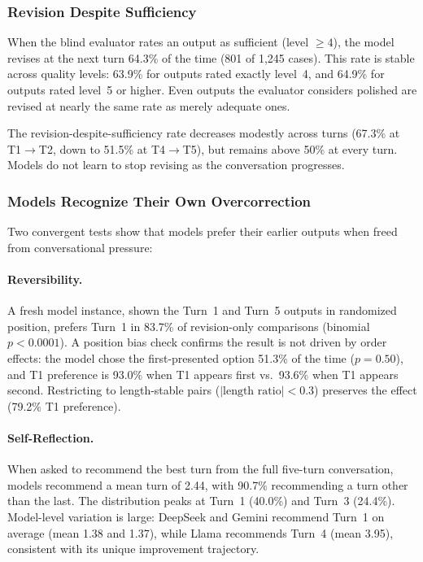 \subsubsection{Revision Despite Sufficiency}

When the blind evaluator rates an output as sufficient (level $\geq 4$), the model revises at the next turn 64.3\% of the time (801 of 1,245 cases). This rate is stable across quality levels: 63.9\% for outputs rated exactly level~4, and 64.9\% for outputs rated level~5 or higher. Even outputs the evaluator considers polished are revised at nearly the same rate as merely adequate ones.

The revision-despite-sufficiency rate decreases modestly across turns (67.3\% at T1$\to$T2, down to 51.5\% at T4$\to$T5), but remains above 50\% at every turn. Models do not learn to stop revising as the conversation progresses.

\subsubsection{Models Recognize Their Own Overcorrection}

Two convergent tests show that models prefer their earlier outputs when freed from conversational pressure:

\paragraph{Reversibility.} A fresh model instance, shown the Turn~1 and Turn~5 outputs in randomized position, prefers Turn~1 in 83.7\% of revision-only comparisons (binomial $p < 0.0001$). A position bias check confirms the result is not driven by order effects: the model chose the first-presented option 51.3\% of the time ($p = 0.50$), and T1 preference is 93.0\% when T1 appears first vs.\ 93.6\% when T1 appears second. Restricting to length-stable pairs ($|\text{length ratio}| < 0.3$) preserves the effect (79.2\% T1 preference).

\paragraph{Self-Reflection.} When asked to recommend the best turn from the full five-turn conversation, models recommend a mean turn of 2.44, with 90.7\% recommending a turn other than the last. The distribution peaks at Turn~1 (40.0\%) and Turn~3 (24.4\%). Model-level variation is large: DeepSeek and Gemini recommend Turn~1 on average (mean 1.38 and 1.37), while Llama recommends Turn~4 (mean 3.95), consistent with its unique improvement trajectory.

